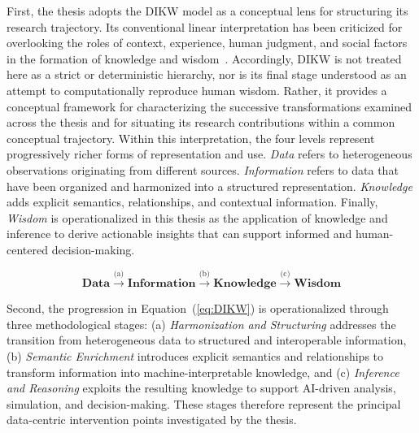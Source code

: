 First, the thesis adopts the DIKW model as a conceptual lens for structuring its research trajectory. Its conventional linear interpretation has been criticized for overlooking the roles of context, experience, human judgment, and social factors in the formation of knowledge and wisdom~\cite{peters_dikw_2025}. Accordingly, DIKW is not treated here as a strict or deterministic hierarchy, nor is its final stage understood as an attempt to computationally reproduce human wisdom. Rather, it provides a conceptual framework for characterizing the successive transformations examined across the thesis and for situating its research contributions within a common conceptual trajectory. Within this interpretation, the four levels represent progressively richer forms of representation and use. \emph{Data} refers to heterogeneous observations originating from different sources. \emph{Information} refers to data that have been organized and harmonized into a structured representation. \emph{Knowledge} adds explicit semantics, relationships, and contextual information. Finally, \emph{Wisdom} is operationalized in this thesis as the application of knowledge and inference to derive actionable insights that can support informed and human-centered decision-making.

\begin{equation}
\label{eq:DIKW}
\textbf{Data}
\xrightarrow{\text{(a)}}
\textbf{Information}
\xrightarrow{\text{(b)}}
\textbf{Knowledge}
\xrightarrow{\text{(c)}}
\textbf{Wisdom}
\end{equation}

Second, the progression in Equation~(\ref{eq:DIKW}) is operationalized through three methodological stages: (a) \emph{Harmonization and Structuring} addresses the transition from heterogeneous data to structured and interoperable information, (b) \emph{Semantic Enrichment} introduces explicit semantics and relationships to transform information into machine-interpretable knowledge, and (c) \emph{Inference and Reasoning} exploits the resulting knowledge to support AI-driven analysis, simulation, and decision-making. These stages therefore represent the principal data-centric intervention points investigated by the thesis.

